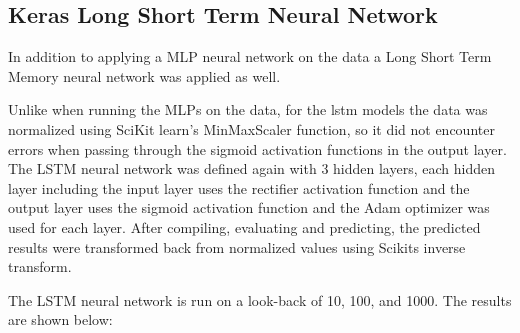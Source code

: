 \subsection{Keras Long Short Term Neural Network}\label{sec:data}

In addition to applying a MLP neural network on the data a Long Short Term Memory neural network was applied as well. 

Unlike when running the MLPs on the data, for the lstm models the data was normalized using SciKit learn's MinMaxScaler function, so it did not encounter errors when passing through the sigmoid activation functions in the output layer. The LSTM neural network was defined again with 3 hidden layers, each hidden layer including the input layer uses the rectifier activation function and the output layer uses the sigmoid activation function and the Adam optimizer was used for each layer. \cite{brownlee_2017_0}
After compiling, evaluating and predicting, the predicted results were transformed back from normalized values using Scikits inverse transform. 

The LSTM neural network is run on a look-back of 10, 100, and 1000. The results are shown below:

